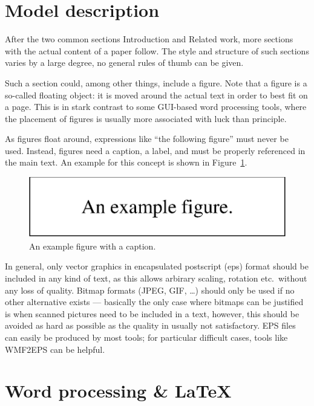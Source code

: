 \documentclass[12pt,twoside,doublepage]{article}
\begin{document}
\section{Model description}
\label{sec:model}

After the two common sections Introduction and Related work, more
sections with the actual content of a paper follow. The style and
structure of such sections varies by a large degree, no general rules
of thumb can be given.

Such a section could, among other things, include a figure. Note that
a figure is a so-called floating object: it is moved around the actual
text in order to best fit on a page. This is in stark contrast to some
GUI-based word processing tools, where the placement of figures is
usually more associated with luck than principle.

As figures float around, expressions like ``the following figure''
must never be used. Instead, figures need a caption, a label, and must
be properly referenced in the main text. An example for this concept
is shown in Figure~\ref{fig:example}.

\begin{figure}[htbp]
  \begin{center}
    \includegraphics{example}
    \caption{An example figure with a caption.}
    \label{fig:example}
  \end{center}
\end{figure}

In general, only vector graphics in encapsulated postscript (eps)
format should be included in any kind of text, as this allows arbirary
scaling, rotation etc.\ without any loss of quality. Bitmap formats
(JPEG, GIF, \dots) should only be used if no other alternative exists
--- basically the only case where bitmaps can be justified is when
scanned pictures need to be included in a text, however, this should
be avoided as hard as possible as the quality in usually not
satisfactory. EPS files can easily be produced by most tools; for
particular difficult cases, tools like WMF2EPS can be helpful.

\section{Word processing \& \LaTeX}
\label{sec:latex}
\end{document}
